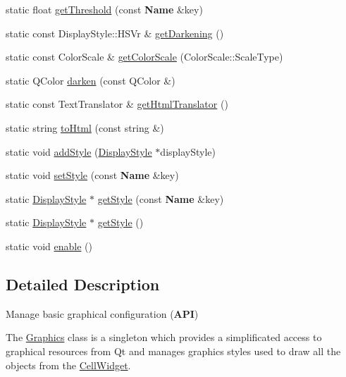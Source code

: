 \begin{DoxyCompactItemize}
static float \mbox{\hyperlink{classHurricane_1_1Graphics_a2291edddc743edc44fdea26437f3095f}{get\+Threshold}} (const \textbf{ Name} \&key)
\item 
static const Display\+Style\+::\+H\+S\+Vr \& \mbox{\hyperlink{classHurricane_1_1Graphics_af34b6fe518ecb3f2959731f055ee27ff}{get\+Darkening}} ()
\item 
static const Color\+Scale \& \mbox{\hyperlink{classHurricane_1_1Graphics_a8735a458885beb3b74ad5fb77db82797}{get\+Color\+Scale}} (Color\+Scale\+::\+Scale\+Type)
\item 
static Q\+Color \mbox{\hyperlink{classHurricane_1_1Graphics_ab4c69a277249850a397a4c5fce31f965}{darken}} (const Q\+Color \&)
\item 
static const Text\+Translator \& \mbox{\hyperlink{classHurricane_1_1Graphics_a2f5e702ff1ea293edc5a89aaae1facf2}{get\+Html\+Translator}} ()
\item 
static string \mbox{\hyperlink{classHurricane_1_1Graphics_a51b3772138b33a85204abbee08898987}{to\+Html}} (const string \&)
\item 
static void \mbox{\hyperlink{classHurricane_1_1Graphics_ac64dd095224b3f9dfbbdcfc242b11a77}{add\+Style}} (\mbox{\hyperlink{classHurricane_1_1DisplayStyle}{Display\+Style}} $\ast$display\+Style)
\item 
static void \mbox{\hyperlink{classHurricane_1_1Graphics_acb9975e354d7c802fa3064ceb800db90}{set\+Style}} (const \textbf{ Name} \&key)
\item 
static \mbox{\hyperlink{classHurricane_1_1DisplayStyle}{Display\+Style}} $\ast$ \mbox{\hyperlink{classHurricane_1_1Graphics_a2506213ff4c28b22d356e7bfbb242ed6}{get\+Style}} (const \textbf{ Name} \&key)
\item 
static \mbox{\hyperlink{classHurricane_1_1DisplayStyle}{Display\+Style}} $\ast$ \mbox{\hyperlink{classHurricane_1_1Graphics_aef89b1aa2be83b61ae0838a219d2b696}{get\+Style}} ()
\item 
static void \mbox{\hyperlink{classHurricane_1_1Graphics_a08e5240382c4bc97fd84b6fa0e7d8b8e}{enable}} ()
\end{DoxyCompactItemize}


\subsection{Detailed Description}
Manage basic graphical configuration ({\bfseries A\+PI}) 

The \mbox{\hyperlink{classHurricane_1_1Graphics}{Graphics}} class is a singleton which provides a simplificated access to graphical resources from Qt and manages graphics styles used to draw all the objects from the \mbox{\hyperlink{classHurricane_1_1CellWidget}{Cell\+Widget}}. 

